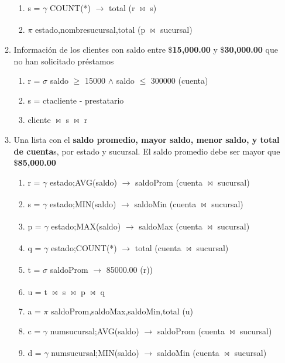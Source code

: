 \documentclass[10pt,letterpaper,fleqn]{article}
\begin{document}
\begin{enumerate}
\begin{enumerate}[a]
\begin{enumerate}[1]
                \item \textbar \quad s = $\gamma$ COUNT(*) $\xrightarrow[]{}$ total (r $\bowtie$ s)
                \item \textbar \quad $\pi$ estado,nombresucursal,total (p $\bowtie$ sucursal)
            \end{enumerate}
            \item Información de los clientes con saldo entre $\$$\textbf{15,000.00} y $\$$\textbf{30,000.00} que no han solicitado préstamos
            \begin{enumerate}[1]
                \item \textbar \quad r = $\sigma$ saldo $\geq$ 15000 $\land$ saldo $\leq$ 300000 (cuenta)
                \item \textbar \quad s = ctacliente - prestatario
                \item \textbar \quad cliente $\bowtie$ s $\bowtie$ r
            \end{enumerate}
            \item Una lista con el \textbf{saldo promedio, mayor saldo, menor saldo, y total de cuenta}s, por estado y sucursal. El saldo promedio debe ser mayor que $\$$\textbf{85,000.00}
            \begin{enumerate}[1]
                \item \textbar \quad r = $\gamma$ estado;AVG(saldo) $\xrightarrow[]{}$ saldoProm (cuenta $\bowtie$ sucursal)
                \item \textbar \quad s = $\gamma$ estado;MIN(saldo) $\xrightarrow[]{}$ saldoMin (cuenta $\bowtie$ sucursal)
                \item \textbar \quad p = $\gamma$ estado;MAX(saldo) $\xrightarrow[]{}$ saldoMax (cuenta $\bowtie$ sucursal)
                \item \textbar \quad q = $\gamma$ estado;COUNT(*) $\xrightarrow[]{}$ total (cuenta $\bowtie$ sucursal)
                \item \textbar \quad t = $\sigma$ saldoProm $\xrightarrow[]{}$ 85000.00 (r))
                \item \textbar \quad u = t $\bowtie$ s $\bowtie$ p $\bowtie$ q
                \item \textbar \quad a = $\pi$ saldoProm,saldoMax,saldoMin,total (u)
                \item \textbar \quad c = $\gamma$ numsucursal;AVG(saldo) $\xrightarrow[]{}$ saldoProm (cuenta $\bowtie$ sucursal)
                \item \textbar \quad d = $\gamma$ numsucursal;MIN(saldo) $\xrightarrow[]{}$ saldoMin (cuenta $\bowtie$ sucursal)

\end{enumerate}
\end{enumerate}
\end{enumerate}
\end{document}
